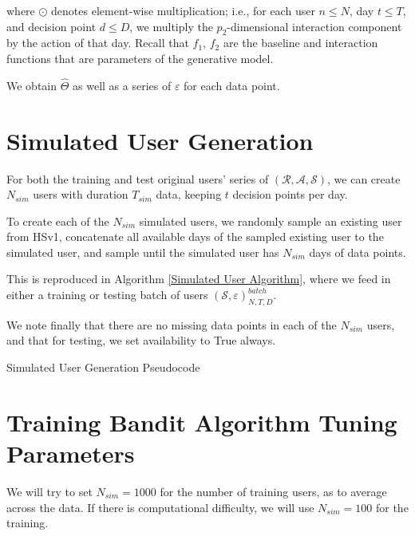 where $\odot$ denotes element-wise multiplication; i.e., for each user $n \le N$, day $t \le T$, and decision point $d \le D$, we multiply the $p_2$-dimensional interaction component by the action of that day.   Recall that $f_1$, $f_2$ are the baseline and interaction functions that are parameters of the generative model.

We obtain $\hat{\Theta}$ as well as a series of $\varepsilon$ for each data point.



\section{Simulated User Generation}

For both the training and test original users' series of $(\mathcal{R}, \mathcal{A}, \mathcal{S})$, we can create $N_{sim}$ users with duration $T_{sim}$ data, keeping $t$ decision points per day.

To create each of the $N_{sim}$ simulated users, we randomly sample an existing user from HSv1, concatenate all available days of the sampled existing user to the simulated user, and sample until the simulated user has $N_{sim}$ days of data points. 

This is reproduced in Algorithm \ref{Simulated User Algorithm}, where we feed in either a training or testing batch of users $(\mathcal{S}, \varepsilon)_{N,T,D}^{batch}$.


We note finally that there are no missing data points in each of the $N_{sim}$ users, and that for testing, we set availability to True always.


\begin{algorithm}[H]
\label{Simulated User Algorithm}
 \caption{Simulated User Generation Pseudocode}
\end{algorithm}


\section{Training Bandit Algorithm Tuning Parameters}


We will try to set $N_{sim} = 1000$ for the number of training users, as to average across the data.  If there is computational difficulty, we will use $N_{sim} = 100$ for the training.

